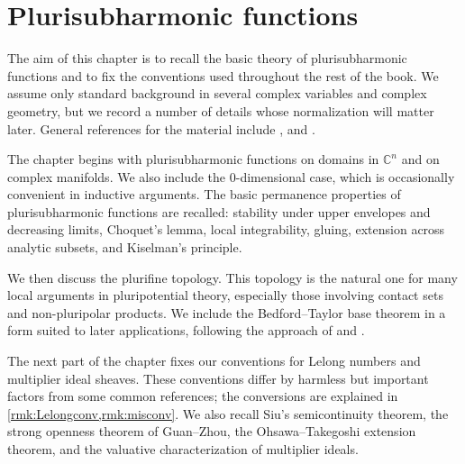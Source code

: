\chapter{Plurisubharmonic functions}
\label{chap:pshfunctions}

The aim of this chapter is to recall the basic theory of plurisubharmonic functions and to fix the conventions used throughout the rest of the book. We assume only standard background in several complex variables and complex geometry, but we record a number of details whose normalization will matter later. General references for the material include \cite{GZ17}, \cite{Dem12} and \cite{DemBook}.

The chapter begins with plurisubharmonic functions on domains in $\mathbb C^n$ and on complex manifolds. We also include the $0$-dimensional case, which is occasionally convenient in inductive arguments. The basic permanence properties of plurisubharmonic functions are recalled: stability under upper envelopes and decreasing limits, Choquet's lemma, local integrability, gluing, extension across analytic subsets, and Kiselman's principle.

We then discuss the plurifine topology. This topology is the natural one for many local arguments in pluripotential theory, especially those involving contact sets and non-pluripolar products. We include the Bedford--Taylor base theorem in a form suited to later applications, following the approach of \cite{BT87} and \cite{EMW06}.

The next part of the chapter fixes our conventions for Lelong numbers and multiplier ideal sheaves. These conventions differ by harmless but important factors from some common references; the conversions are explained in \cref{rmk:Lelongconv,rmk:misconv}. We also recall Siu's semicontinuity theorem, the strong openness theorem of Guan--Zhou, the Ohsawa--Takegoshi extension theorem, and the valuative characterization of multiplier ideals.

